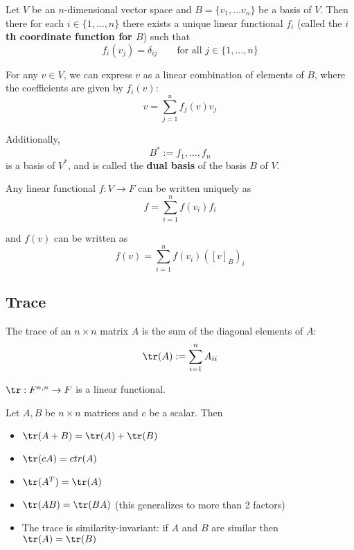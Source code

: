 \begin{definition}
\end{definition}
\begin{definition}
\end{definition}
\begin{lemma}
  Let $V$ be an $n$-dimensional vector space and $B = \{v_1, \ldots v_n\}$ be a basis of $V$. Then there for each $i \in \{1, \ldots, n\}$ there exists a unique linear functional $f_i$ (called the \textbf{$i$th coordinate function for $B$}) such that
  \[
    f_i(v_j) = \delta_{ij} \qquad \text{for all $j \in \{1, \ldots, n\}$}
  \]

  For any $v \in V$, we can express $v$ as a linear combination of elements of $B$, where the coefficients are given by $f_i(v)$:
  \[
    v = \sum_{j = 1}^n f_j(v) v_j
  \]

  Additionally, 
  \[
    B^* := {f_1, \ldots, f_n}
  \]
  is a basis of $V^*$, and is called the \textbf{dual basis} of the basis $B$ of $V$.

  Any linear functional $f : V \to F$ can be written uniquely as
  \[
    f = \sum_{i = 1}^n f(v_i) f_i
  \]

  and $f(v)$ can be written as
  \[
    f(v) = \sum_{i = 1}^n f(v_i) ([v]_B)_i
  \]
\end{lemma}

\subsection{Trace}

\begin{definition}
  The trace of an $n \times n$ matrix $A$ is the sum of the diagonal elements of $A$:
  \[
    \tr(A) := \sum_{i = 1}^n A_{ii}
  \]

  $\tr : F^{n,n} \to F$ is a linear functional.
\end{definition}

\begin{theorem}
  Let $A, B$ be $n \times n$ matrices and $c$ be a scalar. Then
  \begin{itemize}
    \item $\tr(A + B) = \tr(A) + \tr(B)$
    \item $\tr(cA) = c tr(A)$
    \item $\tr(A^T) = \tr(A)$
    \item $\tr(AB) = \tr(BA)$ (this generalizes to more than 2 factors)
    \item The trace is similarity-invariant: if $A$ and $B$ are similar then $\tr(A) = \tr(B)$
  \end{itemize}
\end{theorem}

